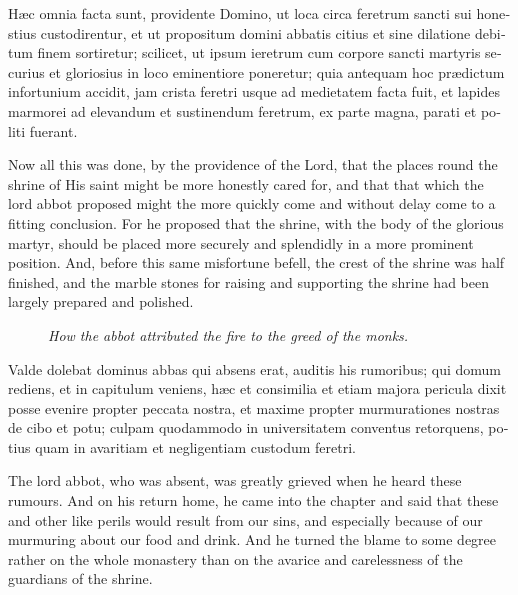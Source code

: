\documentclass{book}
\newcommand{\blockhead}[4][]{
\begin{figure}
\centering
\vspace{#4}
\parbox{2.75cm}{\begin{center}\footnotesize \color{BrickRed} \emph{#2}\\ #1 \end{center}}
\end{figure}
}
\begin{document}
\begin{paracol}{2}
\switchcolumn*

\begin{otherlanguage}{latin}
H\ae{}c omnia facta sunt, providente Domino, ut loca circa feretrum sancti sui honestius custodirentur, et ut propositum domini abbatis citius et sine dilatione debitum finem sortiretur; scilicet, ut ipsum ieretrum cum corpore sancti martyris securius et gloriosius in loco eminentiore poneretur; quia antequam hoc pr\ae{}dictum infortunium accidit, jam crista feretri usque ad medietatem facta fuit, et lapides marmorei ad elevandum et sustinendum feretrum, ex parte magna, parati et politi fuerant.
\end{otherlanguage}

\switchcolumn

Now all this was done, by the providence of the Lord, that the places round the shrine of His saint might be more honestly cared for, and that that which the lord abbot proposed might the more quickly come and without delay come to a fitting conclusion. For he proposed that the shrine, with the body of the glorious martyr, should be placed more securely and splendidly in a more prominent position. And, before this same misfortune befell, the crest of the shrine was half finished, and the marble stones for raising and supporting the shrine had been largely prepared and polished.

\switchcolumn*

\begin{otherlanguage}{latin}
\blockhead{How the abbot attributed the fire to the greed of the monks.}{4}{-.55cm}
Valde dolebat dominus abbas qui absens erat, auditis his rumoribus; qui domum rediens, et in capitulum veniens, h\ae{}c et consimilia et etiam majora pericula dixit posse evenire propter peccata nostra, et maxime propter murmurationes nostras de cibo et potu; culpam quodammodo in universitatem conventus retorquens, potius quam in avaritiam et negligentiam custodum feretri.

\end{otherlanguage}

\switchcolumn

The lord abbot, who was absent, was greatly grieved when he heard these rumours. And on his return home, he came into the chapter and said that these and other like perils would result from our sins, and especially because of our murmuring about our food and drink. And he turned the blame to some degree rather on the whole monastery than on the avarice and carelessness of the guardians of the shrine.


\end{paracol}
\end{document}
